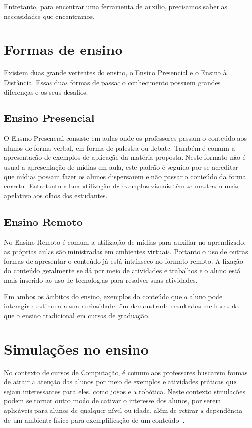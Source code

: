 \documentclass[tcc,capa]{texufpel}
\begin{document}
Entretanto, para encontrar uma ferramenta de auxilio, precisamos saber as necessidades que encontramos. 

\section{Formas de ensino}

Existem duas grande vertentes do ensino, o Ensino Presencial e o Ensino à Distância. Essas duas formas de passar o conhecimento possuem grandes diferenças e os seus desafios. 

\subsection{Ensino Presencial}

O Ensino Presencial consiste em aulas onde os professores passam o conteúdo aos alunos de forma verbal, em forma de palestra ou debate. Também é comum a apresentação de exemplos de aplicação da matéria proposta. Neste formato não é usual a apresentação de mídias em aula, este padrão é seguido por se acreditar que mídias possam fazer os alunos dispersarem e não passar o conteúdo da forma correta. Entretanto a boa utilização de exemplos visuais têm se mostrado mais apelativo aos olhos dos estudantes.

\subsection{Ensino Remoto}

No Ensino Remoto é comum a utilização de mídias para auxiliar no aprendizado, as próprias aulas são ministradas em ambientes virtuais. Portanto o uso de outras formas de apresentar o conteúdo já está intrínseco no formato remoto. A fixação do conteúdo geralmente se dá por meio de atividades e trabalhos e o aluno está mais inserido ao uso de tecnologias para resolver suas atividades.

Em ambos os âmbitos do ensino, exemplos do conteúdo que o aluno pode interagir e estimula a sua curiosidade têm demonstrado resultados melhores do que o ensino tradicional em cursos de graduação.

\section{Simulações no ensino}%

No contexto de cursos de Computação, é comum aos professores buscarem formas de atrair a atenção dos alunos por meio de exemplos e atividades práticas que sejam interessantes para eles, como jogos e a robótica. Neste contexto simulações podem se tornar outro modo de cativar o interesse dos alunos, por serem aplicáveis para alunos de qualquer nível ou idade, além de retirar a dependência de um ambiente físico para exemplificação de um conteúdo~\cite{kincaid2003simulation}.
\end{document}

